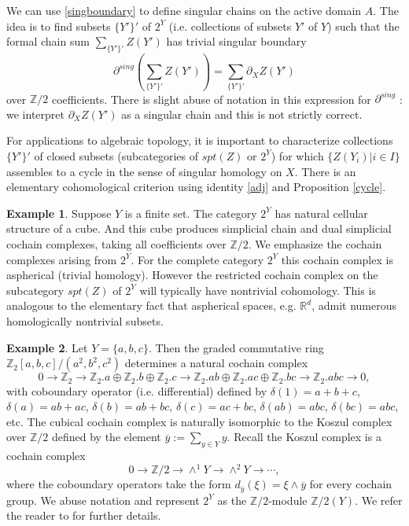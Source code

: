 \documentclass[12pt]{amsart}
\theoremstyle{definition}
\newtheorem{exx}{Example}
\theoremstyle{remark}
\newcommand{\bR}{\mathbb{R}}
\newcommand{\bZ}{\mathbb{Z}}
\newcommand{\del}{\partial}
\begin{document}
We can use \ref{singboundary} to define singular chains on the active domain $A$. The idea is to find subsets $\{Y'\}'$ of $2^Y$ (i.e. collections of subsets $Y'$ of $Y$) such that the formal chain sum $\sum_{\{Y'\}'} Z(Y')$ has trivial singular boundary $$\del^{sing} (\sum_{\{Y'\}'} Z(Y'))=\sum_{\{Y'\}'} \del_X Z(Y')$$ over $\bZ/2$ coefficients. There is slight abuse of notation in this expression for $\del^{sing}$ : we interpret $\del_X Z(Y')$ as a singular chain and this is not strictly correct. 

For applications to algebraic topology, it is important to characterize collections $\{Y'\}'$ of closed subsets (subcategories of $spt(Z)$ or $2^Y$) for which $\{Z(Y_i)| i\in I\}$ assembles to a cycle in the sense of singular homology on $X$. There is an elementary cohomological criterion using identity \eqref{adj} and Proposition \ref{cycle}. %



\begin{exx}
Suppose $Y$ is a finite set. The category $2^Y$ has natural cellular structure of a cube. And this cube produces simplicial chain and dual simplicial cochain complexes, taking all coefficients over $\bZ/2$. We emphasize the cochain complexes arising from $2^Y$. For the complete category $2^Y$ this cochain complex is aspherical (trivial homology). However the restricted cochain complex on the subcategory $spt(Z)$ of $2^Y$ will typically have nontrivial cohomology. This is analogous to the elementary fact that aspherical spaces, e.g. $\bR^d$, admit numerous homologically nontrivial subsets. 
\end{exx}

\begin{exx} 
Let $Y=\{a,b,c\}$. Then the graded commutative ring $\bZ_2[a,b,c]/(a^2, b^2, c^2)$ determines a natural cochain complex $$0\to \bZ_2 \to \bZ_2.a\oplus \bZ_2.b \oplus \bZ_2.c \to \bZ_2.ab \oplus \bZ_2.ac \oplus \bZ_2.bc \to \bZ_2.abc \to 0, $$ with coboundary operator (i.e. differential) defined by $\delta(1)=a+b+c$, $\delta(a)=ab+ac$, $\delta(b)=ab+bc$, $\delta(c)=ac+bc$, $\delta(ab)=abc$, $\delta(bc)=abc$, etc. The cubical cochain complex is naturally isomorphic to the Koszul complex over $\bZ/2$ defined by the element $\overline{y}:=\sum_{y\in Y} y$. Recall the Koszul complex is a cochain complex $$0\to \bZ/2 \to \wedge^1 Y \to \wedge^2 Y \to \cdots, $$ where the coboundary operators take the form $d_{\overline{y}}(\xi)=\xi \wedge \overline{y}$ for every cochain group. We abuse notation and represent $2^Y$ as the $\bZ/2$-module $\bZ/2(Y)$. We refer the reader to \cite[Ch.IV.A]{local} for further details.
\end{exx}
\end{document}
